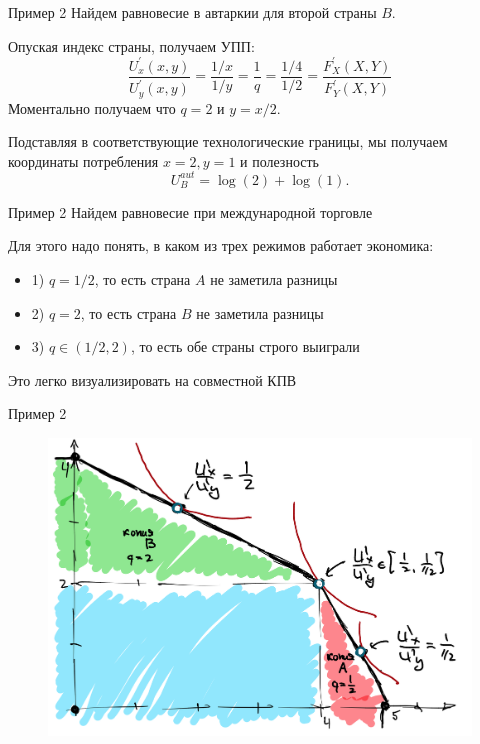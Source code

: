 \documentclass{beamer}
\begin{document}
\begin{frame}{Пример 2}
Найдем равновесие в автаркии для второй страны $B$. 

Опуская индекс страны, получаем УПП:
$$ \frac{U^{'}_x(x,y)}{U^{'}_y(x,y)} = \frac{1/x}{1/y} = \frac{1}{q} = \frac{1/4}{1/2} = \frac{F^{'}_X(X,Y)}{F^{'}_Y(X,Y)}$$
Моментально получаем что $q = 2$ и $y = x/2$.

Подставляя в соответствующие технологические границы, мы получаем координаты потребления $x = 2, y = 1$ и полезность $$U^{aut}_B = \log(2) + \log(1).$$

\end{frame}

\begin{frame}{Пример 2}
Найдем равновесие при международной торговле

Для этого надо понять, в каком из трех режимов работает экономика:

\begin{itemize}
  \item 1) $q = 1/2$, то есть страна $A$ не заметила разницы
  \item 2) $q = 2$, то есть страна $B$ не заметила разницы 
  \item 3) $q \in (1/2,2)$, то есть обе страны строго выиграли
\end{itemize}
Это легко визуализировать на совместной КПВ
\end{frame}

\begin{frame}{Пример 2}
\begin{figure}[hbt]
\centering
\includegraphics[width=1 \textwidth]{pic4.png}
\end{figure}
\end{frame}
\end{document}
